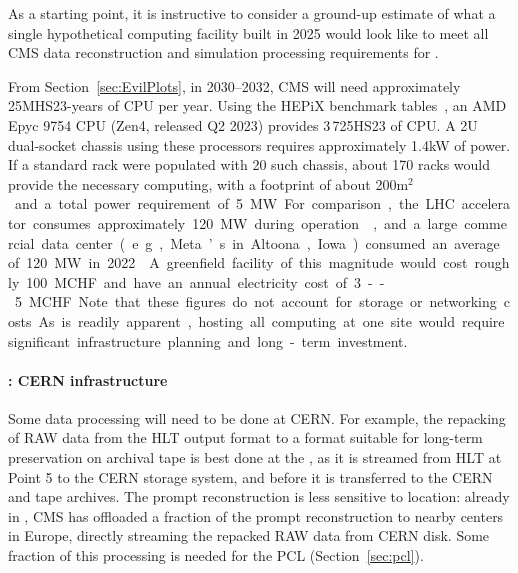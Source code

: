 As a starting point, it is instructive to consider a ground-up estimate of what a single hypothetical computing facility built in 2025 would look like to meet all CMS data reconstruction and simulation processing requirements for \RunFour. 

From Section~\ref{sec:EvilPlots}, in 2030--2032, CMS will need approximately 25\unit{MHS23}-years of \gls{CPU} per year. Using the HEPiX benchmark tables~\cite{HEPiX-tables}, an AMD Epyc 9754 \gls{CPU} (Zen4, released Q2 2023) provides 3\,725\unit{HS23} of \gls{CPU}. A 2U dual-socket chassis using these processors requires approximately 1.4\unit{kW} of power. If a standard rack were populated with 20 such chassis, about 170 racks would provide the necessary computing, with a footprint of about 200\unit{m$^2$} and a total power requirement of 5\unit{MW}. 

For comparison, the LHC accelerator consumes approximately 120\unit{MW} during operation~\cite{lhc-power-consumption}, and a large commercial data center (e.g., Meta’s in Altoona, Iowa) consumed an average of 120\unit{MW} in 2022~\cite{META-env}. A greenfield facility of this magnitude would cost roughly 100\unit{MCHF} and have an annual electricity cost of 3--5\unit{MCHF}. Note that these figures do not account for storage or networking costs. As is readily apparent, hosting all computing at one site would require significant infrastructure planning and long-term investment.

\paragraph{\TierZero: CERN infrastructure}
Some data processing will need to be done at CERN. For example, the repacking of \gls{RAW} data from the \gls{HLT} output format to a format suitable for long-term preservation on archival tape is best done at the \TierZero, as it is streamed from \gls{HLT} at Point 5 to the CERN storage system, and before it is transferred to the CERN and \TierOne tape archives. The prompt reconstruction is less sensitive to location: already in \RunThree, CMS has offloaded a fraction of the prompt reconstruction to nearby \TierOne centers in Europe, directly streaming the repacked \gls{RAW} data from CERN disk. Some fraction of this processing is needed for the \gls{PCL} (Section~\ref{sec:pcl}).

